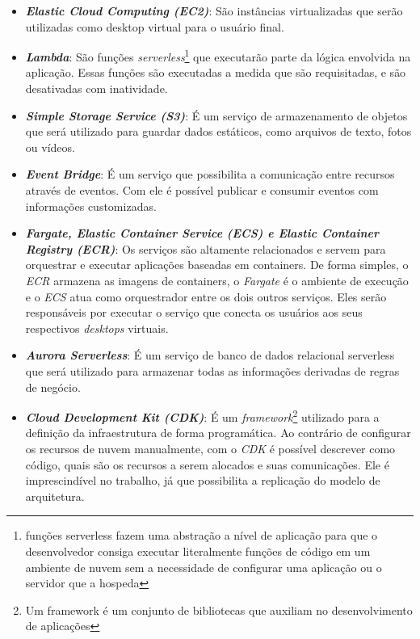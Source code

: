 \begin{itemize}

    \item \textbf{\textit{Elastic Cloud Computing (EC2)}}: São instâncias virtualizadas que serão utilizadas como desktop virtual para o usuário final.
    
    \item \textbf{\textit{Lambda}}: São funções \textit{serverless}\footnote{funções serverless fazem uma abstração a nível de aplicação para que o desenvolvedor consiga executar literalmente funções de código em um ambiente de nuvem sem a necessidade de configurar uma aplicação ou o servidor que a hospeda} que executarão parte da lógica envolvida na aplicação. Essas funções são executadas a medida que são requisitadas, e são desativadas com inatividade.
    
    \item \textbf{\textit{Simple Storage Service (S3)}}: É um serviço de armazenamento de objetos que será utilizado para guardar dados estáticos, como arquivos de texto, fotos ou vídeos.
    
    \item \textbf{\textit{Event Bridge}}: É um serviço que possibilita a comunicação entre recursos através de eventos. Com ele é possível publicar e consumir eventos com informações customizadas.
    
    \item \textbf{\textit{Fargate, Elastic Container Service (ECS) e Elastic Container Registry (ECR)}}: Os serviços são altamente relacionados e servem para orquestrar e executar aplicações baseadas em containers. De forma simples, o \textit{ECR} armazena as imagens de containers, o \textit{Fargate} é o ambiente de execução e o \textit{ECS} atua como orquestrador entre os dois outros serviços. Eles serão responsáveis por executar o serviço que conecta os usuários aos seus respectivos \textit{desktops} virtuais.
    
    \item \textbf{\textit{Aurora Serverless}}: É um serviço de banco de dados relacional serverless que será utilizado para armazenar todas as informações derivadas de regras de negócio.

    \item \textbf{\textit{Cloud Development Kit (CDK)}}: É um \textit{framework}\footnote{Um framework é um conjunto de bibliotecas que auxiliam no desenvolvimento de aplicações} utilizado para a definição da infraestrutura de forma programática. Ao contrário de configurar os recursos de nuvem manualmente, com o \textit{CDK} é possível descrever como código, quais são os recursos a serem alocados e suas comunicações. Ele é imprescindível no trabalho, já que possibilita a replicação do modelo de arquitetura.
    
\end{itemize}

